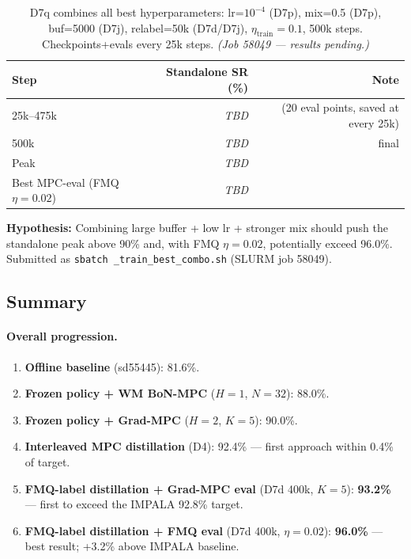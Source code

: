 \documentclass[11pt]{article}
\newcommand{\tbd}[0]{\textit{TBD}}
\begin{document}
\begin{table}[h]
\centering
\caption{D7q combines all best hyperparameters: lr=$10^{-4}$ (D7p), mix=0.5 (D7p),
  buf=5000 (D7j), relabel=50k (D7d/D7j), $\eta_\text{train}=0.1$, 500k steps.
  Checkpoints+evals every 25k steps.
  \textit{(Job 58049 --- results pending.)}}
\begin{tabular}{lrr}
\toprule
Step & Standalone SR (\%) & Note \\
\midrule
25k--475k & \tbd & (20 eval points, saved at every 25k) \\
500k      & \tbd & final \\
\midrule
Peak & \tbd & \\
Best MPC-eval (FMQ $\eta=0.02$) & \tbd & \\
\bottomrule
\end{tabular}

\medskip
\footnotesize
\textbf{Hypothesis:} Combining large buffer + low lr + stronger mix should push the
standalone peak above 90\% and, with FMQ $\eta=0.02$, potentially exceed 96.0\%.
Submitted as \texttt{sbatch \_train\_best\_combo.sh} (SLURM job 58049).
\normalsize
\end{table}

\subsection*{Summary}

\paragraph{Overall progression.}
\begin{enumerate}
\item \textbf{Offline baseline} (sd55445): 81.6\%.
\item \textbf{Frozen policy + WM BoN-MPC} ($H=1$, $N=32$): 88.0\%.
\item \textbf{Frozen policy + Grad-MPC} ($H=2$, $K=5$): 90.0\%.
\item \textbf{Interleaved MPC distillation} (D4): 92.4\% --- first approach within 0.4\% of target.
\item \textbf{FMQ-label distillation + Grad-MPC eval} (D7d 400k, $K=5$): \textbf{93.2\%}
      --- first to exceed the IMPALA 92.8\% target.
\item \textbf{FMQ-label distillation + FMQ eval} (D7d 400k, $\eta=0.02$): \textbf{96.0\%}
      --- best result; +3.2\% above IMPALA baseline.
\end{enumerate}
\end{document}
